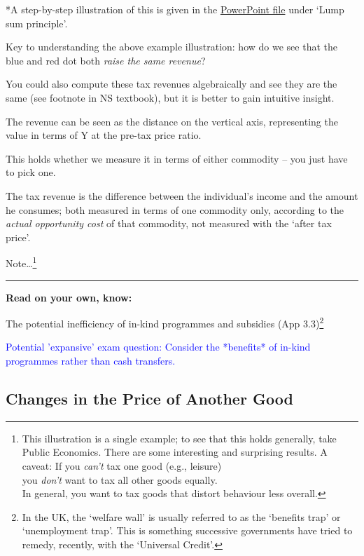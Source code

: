 \documentclass[]{article}
\begin{document}
*A step-by-step illustration of this is given in the
\href{https://www.dropbox.com/s/qhsl6qey0wjcfe5/utility_demand_supplement.pptx?dl=0}{PowerPoint
file} under `Lump sum principle'.

Key to understanding the above example illustration: how do we see that
the blue and red dot both \emph{raise the same revenue}?

You could also compute these tax revenues algebraically and see they are
the same (see footnote in NS textbook), but it is better to gain
intuitive insight.

The revenue can be seen as the distance on the vertical axis,
representing the value in terms of Y at the pre-tax price ratio.

This holds whether we measure it in terms of either commodity -- you
just have to pick one.

The tax revenue is the difference between the individual's income and
the amount he consumes; both measured in terms of one commodity only,
according to the \emph{actual opportunity cost} of that commodity, not
measured with the `after tax price'.

Note\ldots{}\footnote{This illustration is a single example; to see that
  this holds generally, take Public Economics. There are some
  interesting and surprising results. A caveat: If you \emph{can't} tax
  one good (e.g., leisure)\\
  you \emph{don't} want to tax all other goods equally.\\
  In general, you want to tax goods that distort behaviour less overall.}

\begin{center}\rule{0.5\linewidth}{\linethickness}\end{center}

\textbf{Read on your own, know:}

The potential inefficiency of in-kind programmes and subsidies (App
3.3)\footnote{In the UK, the `welfare wall' is usually referred to as
  the `benefits trap' or `unemployment trap'. This is something
  successive governments have tried to remedy, recently, with the
  `Universal Credit'.}

\textcolor{blue}{Potential 'expansive' exam question: Consider the *benefits* of in-kind programmes rather than cash transfers.}

\hypertarget{changes-in-the-price-of-another-good}{%
\subsection{Changes in the Price of Another
Good}\label{changes-in-the-price-of-another-good}}
\end{document}
